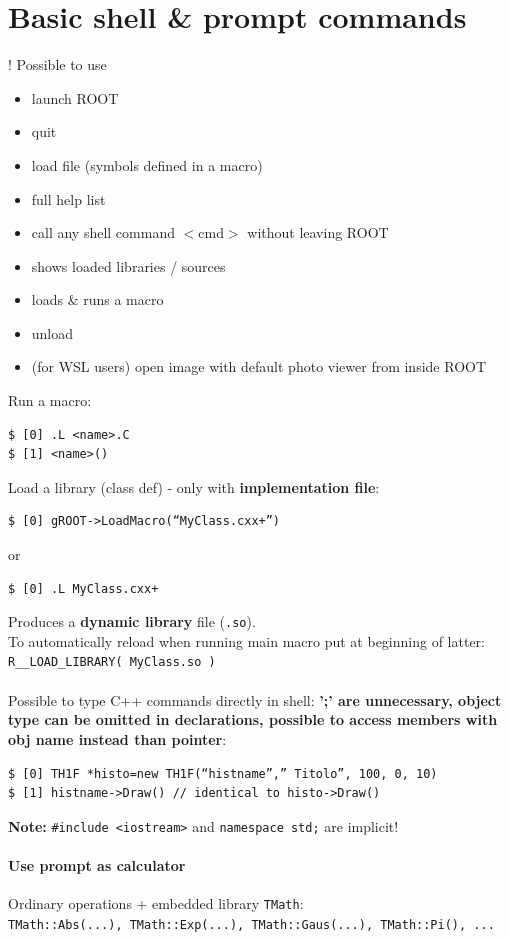 \documentclass[10pt, twoside]{article}
\newcommand{\ttt}[1]{\colorbox{boxgray}{\texttt{#1}}}
\begin{document}
\section{Basic shell \& prompt commands}
! Possible to use 
\begin{itemize}
\item {} launch ROOT
\item {} quit
\item {} load file (symbols defined in a macro)
\item {}  full help list
\item {} call any shell command $<$cmd$>$ without leaving ROOT
\item {} shows loaded libraries / sources
\item {} loads \& runs a macro
\item {} unload
\item {} (for WSL users) open image with default photo viewer from inside ROOT
\end{itemize}
Run a macro:
\begin{verbatim}
$ [0] .L <name>.C
$ [1] <name>()
\end{verbatim}
Load a library (class def) - only with \textbf{implementation file}:
\begin{verbatim}
$ [0] gROOT->LoadMacro(“MyClass.cxx+”)
\end{verbatim}
or
\begin{verbatim}
$ [0] .L MyClass.cxx+
\end{verbatim}
Produces a \textbf{dynamic library} file (\texttt{.so}). \\To automatically reload when running main macro put at beginning of latter:
\ttt{R\_\_LOAD\_LIBRARY( MyClass.so )}
\\~\\Possible to type C++ commands directly in shell: \textbf{';' are unnecessary, object type can be omitted in declarations, possible to access members with obj name instead than pointer}:
\begin{verbatim}
$ [0] TH1F *histo=new TH1F(“histname”,” Titolo”, 100, 0, 10)
$ [1] histname->Draw() // identical to histo->Draw()
\end{verbatim}
\textbf{Note:} \ttt{\#include <iostream>} and \ttt{namespace std;} are implicit!
\paragraph{Use prompt as calculator}
Ordinary operations + embedded library \ttt{TMath}:
\\\ttt{TMath::Abs(...), TMath::Exp(...), TMath::Gaus(...), TMath::Pi(), ...}
\end{document}
